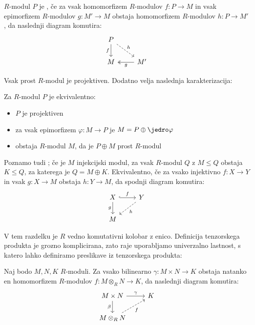 
\begin{definicija}
  $R$-modul $P$ je , če za vsak homomorfizem $R$-modulov $f:
  P \to M$ in vsak epimorfizem $R$-modulov $g: M' \to M$ obstaja homomorfizem
  $R$-modulov $h: P \to M'$, da naslednji diagram komutira:
  \[\begin{tikzcd}
	  P \\
	  M & {M'}
	  \arrow["f"', from=1-1, to=2-1]
	  \arrow["h", dashed, from=1-1, to=2-2]
	  \arrow["g", two heads, from=2-2, to=2-1]
	\end{tikzcd}\]
\end{definicija}

Vsak prost $R$-modul je projektiven.
Dodatno velja naslednja karakterizacija:

\begin{izrek}
  Za $R$-modul $P$ je ekvivalentno:
  \begin{itemize}
  \item $P$ je projektiven
  \item za vsak epimorfizem $\varphi: M \to P$ je $M = P \oplus \jedro \varphi$
  \item obstaja $R$-modul $M$, da je $P \oplus M$ prost $R$-modul
  \end{itemize}
\end{izrek}

Poznamo tudi ; če je $M$ injekcijski modul, za vsak
$R$-modul $Q$ z $M \le Q$ obstaja $K \le Q$, za katerega je $Q = M \oplus K$.
Ekvivalentno, če za vsako injektivno $f: X \to Y$ in vsak $g: X \to M$ obstaja
$h: Y \to M$, da spodnji diagram komutira:
\[\begin{tikzcd}
	X & Y \\
	M
	\arrow["f", hook, from=1-1, to=1-2]
	\arrow["g"', from=1-1, to=2-1]
	\arrow["h", dashed, from=1-2, to=2-1]
  \end{tikzcd}\]


V tem razdelku je $R$ vedno komutativni kolobar z enico.
Definicija tenzorskega produkta je grozno komplicirana, zato raje uporabljamo
univerzalno lastnost, s katero lahko definiramo preslikave iz tenzorskega
produkta:

\begin{izrek}
  Naj bodo $M, N, K$ $R$-moduli.
  Za vsako bilinearno $\gamma: M \times N \to K$ obstaja natanko en homomorfizem
  $R$-modulov $f: M \otimes_R N \to K$, da naslednji diagram komutira:
  \[\begin{tikzcd}
	  {M \times N} & K \\
	  {M \otimes_R N}
	  \arrow["\gamma", from=1-1, to=1-2]
	  \arrow["\beta"', from=1-1, to=2-1]
	  \arrow["f"', dashed, from=2-1, to=1-2]
	\end{tikzcd}\]
\end{izrek}

